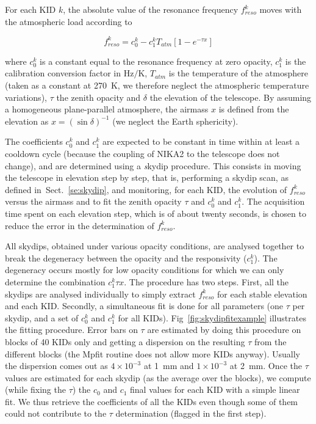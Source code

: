 For each KID $k$, the absolute value of the resonance frequency
$f_{reso}^k$ moves with the atmospheric load according to

\begin{equation}
f_{reso}^k  = c_0^k - c_1^k T_{atm}[1-e^{-\tau x}]
\label{eq:skydip}
\end{equation}


where $c_0^k$ is a constant equal to the resonance frequency at zero
opacity, $c_1^k$ is the calibration conversion factor in Hz$/$K,
$T_{atm}$ is the temperature of the atmosphere (taken as a constant at
270~K, we therefore neglect the atmospheric temperature variations),
$\tau$ the zenith opacity and $\delta$ the elevation of the
telescope.  By assuming a homogeneous plane-parallel atmosphere, the
airmass $x$ is defined from the elevation as $x
= \left(\sin\delta\right)^{-1}$ (we neglect the Earth sphericity).

The coefficients $c_0^k$ and $c_1^k$ are expected to be constant in
time within at least a cooldown cycle (because the coupling of NIKA2
to the telescope does not change), and are determined using a {\emph
skydip} procedure. This consists in moving the telescope in elevation
step by step, that is, performing a skydip scan, as defined
in~Sect.~\ref{se:skydip}, and monitoring, for each KID, the evolution
of $f_{reso}^k$ versus the airmass and to fit the zenith opacity
$\tau$ and $c_0^k$ and $c_1^k$. The acquisition time spent on each
elevation step, which is of about twenty seconds, is chosen to reduce
the error in the determination of $f_{reso}^k$.

All skydips, obtained under various opacity conditions, are analysed
together to break the degeneracy between the opacity and the
responsivity ($c_1^k$). The degeneracy occurs mostly for low opacity
conditions for which we can only determine the combination $c_1^k \tau
x$. The procedure has two steps.  First, all the skydips are analysed
individually to simply extract $f_{reso}^k$ for each stable elevation
and each KID. Secondly, a simultaneous fit is done for all parameters
(one $\tau$ per skydip, and a set of $c_0^k$ and $c_1^k$ for all
KIDs). Fig~\ref{fig:skydipfitexample} illustrates the fitting
procedure.  Error bars on $\tau$ are estimated by doing this procedure
on blocks of 40 KIDs only and getting a dispersion on the resulting
$\tau$ from the different blocks (the Mpfit routine does not allow
more KIDs anyway). Usually the dispersion comes out as $4\times
10^{-3}$ at 1~mm and $1\times 10^{-3}$ at 2~mm. Once the $\tau$ values
are estimated for each skydip (as the average over the blocks), we
compute (while fixing the $\tau$) the $c_0$ and $c_1$ final values for
each KID with a simple linear fit. We thus retrieve the coefficients
of all the KIDs even though some of them could not contribute to the
$\tau$ determination (flagged in the first step).


